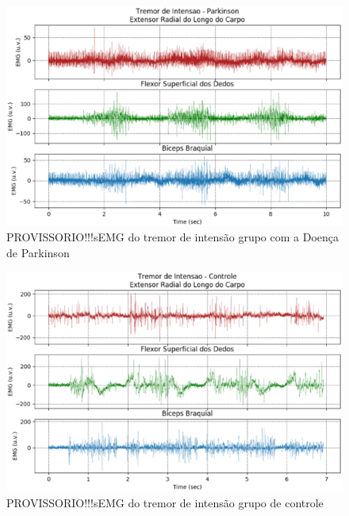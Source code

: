 \begin{figure}[!htb]
    \centering
	\includegraphics[width=1\textwidth]{figuras/tremor_i_parkinson.eps}
	\caption{PROVISSORIO!!!sEMG do tremor de intensão grupo com a Doença de Parkinson}
	\label{tremor_i_parkinson}
\end{figure}

\begin{figure}[!htb]
    \centering
	\includegraphics[width=1\textwidth]{figuras/tremor_intensao.eps}
	\caption{PROVISSORIO!!!sEMG do tremor de intensão grupo de controle}
	\label{tremor_intensao}
\end{figure}